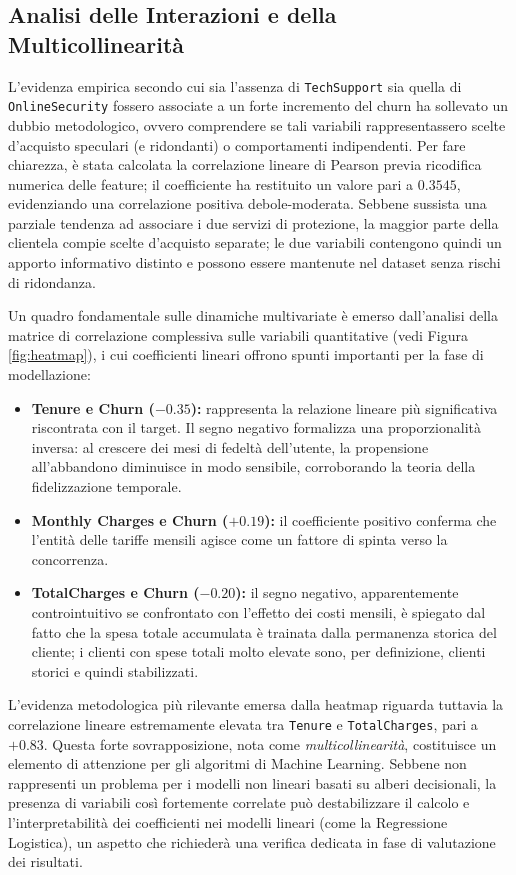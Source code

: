 \documentclass[11pt,a4paper]{article}
\begin{document}
\subsection{Analisi delle Interazioni e della Multicollinearità}
L'evidenza empirica secondo cui sia l'assenza di \texttt{TechSupport} sia quella di \texttt{OnlineSecurity} fossero associate a un forte incremento del churn ha sollevato un dubbio metodologico, ovvero comprendere se tali variabili rappresentassero scelte d'acquisto speculari (e ridondanti) o comportamenti indipendenti. Per fare chiarezza, è stata calcolata la correlazione lineare di Pearson previa ricodifica numerica delle feature; il coefficiente ha restituito un valore pari a $0.3545$, evidenziando una correlazione positiva debole-moderata. Sebbene sussista una parziale tendenza ad associare i due servizi di protezione, la maggior parte della clientela compie scelte d'acquisto separate; le due variabili contengono quindi un apporto informativo distinto e possono essere mantenute nel dataset senza rischi di ridondanza.

Un quadro fondamentale sulle dinamiche multivariate è emerso dall'analisi della matrice di correlazione complessiva sulle variabili quantitative (vedi Figura \ref{fig:heatmap}), i cui coefficienti lineari offrono spunti importanti per la fase di modellazione:
\begin{itemize}
    \item \textbf{Tenure e Churn ($-0.35$):} rappresenta la relazione lineare più significativa riscontrata con il target. Il segno negativo formalizza una proporzionalità inversa: al crescere dei mesi di fedeltà dell'utente, la propensione all'abbandono diminuisce in modo sensibile, corroborando la teoria della fidelizzazione temporale.
    \item \textbf{Monthly Charges e Churn ($+0.19$):} il coefficiente positivo conferma che l'entità delle tariffe mensili agisce come un fattore di spinta verso la concorrenza.
    \item \textbf{TotalCharges e Churn ($-0.20$):} il segno negativo, apparentemente controintuitivo se confrontato con l'effetto dei costi mensili, è spiegato dal fatto che la spesa totale accumulata è trainata dalla permanenza storica del cliente; i clienti con spese totali molto elevate sono, per definizione, clienti storici e quindi stabilizzati.
\end{itemize}

L'evidenza metodologica più rilevante emersa dalla heatmap riguarda tuttavia la correlazione lineare estremamente elevata tra \texttt{Tenure} e \texttt{TotalCharges}, pari a $+0.83$. Questa forte sovrapposizione, nota come \textit{multicollinearità}, costituisce un elemento di attenzione per gli algoritmi di Machine Learning. Sebbene non rappresenti un problema per i modelli non lineari basati su alberi decisionali, la presenza di variabili così fortemente correlate può destabilizzare il calcolo e l'interpretabilità dei coefficienti nei modelli lineari (come la Regressione Logistica), un aspetto che richiederà una verifica dedicata in fase di valutazione dei risultati.
\end{document}
